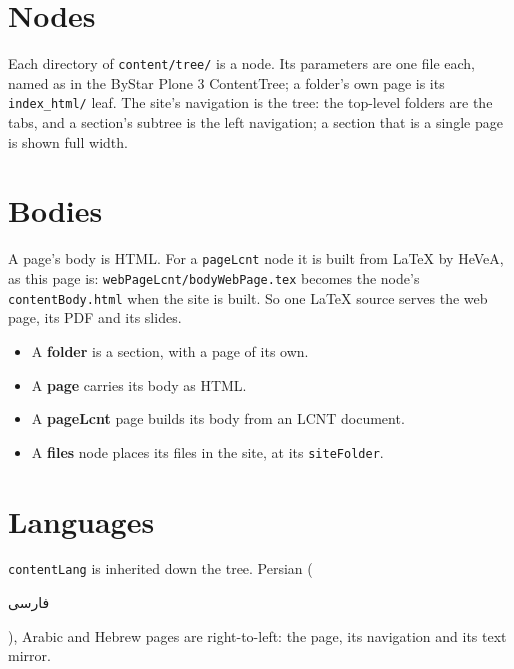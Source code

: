 \section*{Nodes}

\par Each directory of \texttt{content/tree/} is a node. Its parameters are one file each, named as in the
ByStar Plone 3 ContentTree; a folder's own page is its \texttt{index\_html/} leaf. The site's navigation is
the tree: the top-level folders are the tabs, and a section's subtree is the left navigation; a section
that is a single page is shown full width.

\section*{Bodies}

\par A page's body is HTML. For a \texttt{pageLcnt} node it is built from LaTeX by HeVeA, as this page
is: \texttt{webPageLcnt/bodyWebPage.tex} becomes the node's \texttt{contentBody.html} when the site is
built. So one LaTeX source serves the web page, its PDF and its slides.

\begin{itemize}
\item A \textbf{folder} is a section, with a page of its own.
\item A \textbf{page} carries its body as HTML.
\item A \textbf{pageLcnt} page builds its body from an LCNT document.
\item A \textbf{files} node places its files in the site, at its \texttt{siteFolder}.
\end{itemize}

\section*{Languages}

\par \texttt{contentLang} is inherited down the tree. Persian (\begin{fa}فارسی\end{fa}), Arabic and Hebrew
pages are right-to-left: the page, its navigation and its text mirror.
